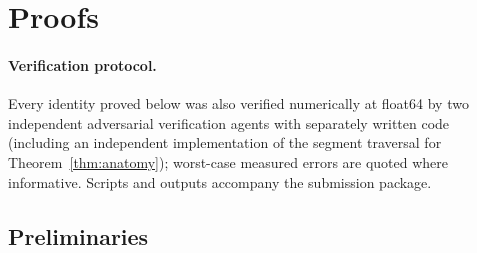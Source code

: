 
\section{Proofs}
\label{app:proofs}

\paragraph{Verification protocol.} Every identity proved below was also
verified numerically at float64 by two independent adversarial verification
agents with separately written code (including an independent implementation
of the segment traversal for Theorem~\ref{thm:anatomy}); worst-case measured
errors are quoted where informative. Scripts and outputs accompany the
submission package.

\subsection{Preliminaries}

